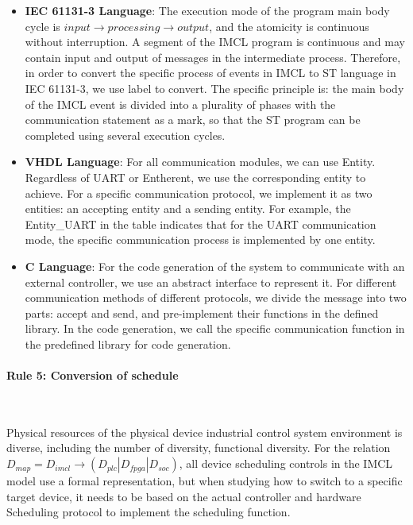 \begin{itemize}
  \item \textbf{IEC 61131-3 Language}: The execution mode of the program main body cycle is $input\rightarrow processing\rightarrow output$, and the atomicity is continuous without interruption. A segment of the IMCL program is continuous and may contain input and output of messages in the intermediate process. Therefore, in order to convert the specific process of events in IMCL to ST language in IEC 61131-3, we use label to convert. The specific principle is: the main body of the IMCL event is divided into a plurality of phases with the communication statement as a mark, so that the ST program can be completed using several execution cycles.
  \item \textbf{VHDL Language}: For all communication modules, we can use Entity. Regardless of UART or Entherent, we use the corresponding entity to achieve. For a specific communication protocol, we implement it as two entities: an accepting entity and a sending entity. For example, the Entity\_UART in the table indicates that for the UART communication mode, the specific communication process is implemented by one entity.
  \item \textbf{C Language}:  For the code generation of the system to communicate with an external controller, we use an abstract interface to represent it. For different communication methods of different protocols, we divide the message into two parts: accept and send, and pre-implement their functions in the defined library. In the code generation, we call the specific communication function in the predefined library for code generation.
\end{itemize}


\paragraph{\textbf{Rule 5: Conversion of schedule}} \

Physical resources of the physical device industrial control system environment is diverse, including the number of diversity, functional diversity. For the relation $D_{map} = D_{imcl} \rightarrow (D_{plc} | D_{fpga} | D_{soc})$, all device scheduling controls in the IMCL model use a formal representation, but when studying how to switch to a specific target device, it needs to be based on the actual controller and hardware Scheduling protocol to implement the scheduling function.


